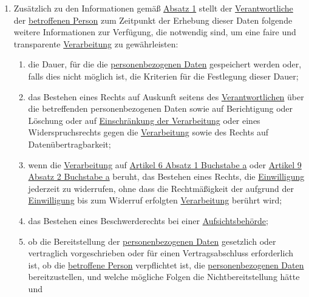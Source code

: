 \begin{enumerate}
\begin{enumerate}
  \end{enumerate}

  \item Zusätzlich zu den Informationen gemäß \hyperref[itm:13-1]{Absatz 1} stellt der \hyperref[itm:04-7]{Verantwortliche} der \hyperref[itm:04-1]{betroffenen
   Person} zum Zeitpunkt der Erhebung dieser Daten folgende weitere Informationen zur Verfügung, die notwendig sind, um
   eine faire und transparente \hyperref[itm:04-2]{Verarbeitung} zu gewährleisten:
  \label{itm:13-2}

  \begin{enumerate}
  
    \item die Dauer, für die die \hyperref[itm:04-1]{personenbezogenen Daten} gespeichert werden oder, falls dies nicht möglich ist, die
     Kriterien für die Festlegung dieser Dauer;
    \label{itm:13-2a}

    \item das Bestehen eines Rechts auf Auskunft seitens des \hyperref[itm:04-7]{Verantwortlichen} über die betreffenden personenbezogenen
     Daten sowie auf Berichtigung oder Löschung oder auf \hyperref[itm:04-3]{Einschränkung der Verarbeitung} oder eines Widerspruchsrechts
     gegen die \hyperref[itm:04-2]{Verarbeitung} sowie des Rechts auf Datenübertragbarkeit;
    \label{itm:13-2b}

    \item wenn die \hyperref[itm:04-2]{Verarbeitung} auf \hyperref[itm:06-1a]{Artikel 6 Absatz 1 Buchstabe a} oder \hyperref[itm:09-2a]
     {Artikel 9 Absatz 2 Buchstabe a} beruht, das Bestehen eines Rechts, die \hyperref[itm:04-11]{Einwilligung} jederzeit zu widerrufen, ohne
     dass die Rechtmäßigkeit der aufgrund der \hyperref[itm:04-11]{Einwilligung} bis zum Widerruf erfolgten \hyperref[itm:04-2]{Verarbeitung} berührt wird;
    \label{itm:13-2c}

    \item das Bestehen eines Beschwerderechts bei einer \hyperref[itm:04-21]{Aufsichtsbehörde};
    \label{itm:13-2d}

    \item ob die Bereitstellung der \hyperref[itm:04-1]{personenbezogenen Daten} gesetzlich oder vertraglich vorgeschrieben oder für einen
     Vertragsabschluss erforderlich ist, ob die \hyperref[itm:04-1]{betroffene Person} verpflichtet ist, die \hyperref[itm:04-1]{personenbezogenen Daten}
     bereitzustellen, und welche mögliche Folgen die Nichtbereitstellung hätte und
    \label{itm:13-2e}


\end{enumerate}
\end{enumerate}
